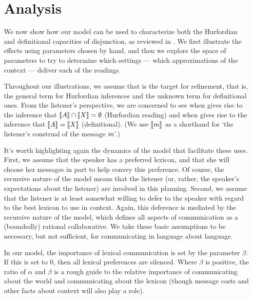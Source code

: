 \documentclass{article}
\begin{document}

\section{Analysis}\label{sec:analysis}

We now show how our model can be used to characterize both the
Hurfordian and definitional capacities of disjunction, as reviewed in
. We first illustrate the effects using parameters
chosen by hand, and then we explore the space of parameters to try to
determine which settings --- which approximations of the context ---
deliver each of the readings. 

Throughout our illustrations, we assume that  is the target
for refinement, that is, the general term for Hurfordian inferences
and the unknown term for definitional ones.  From the listener's
perspective, we are concerned to see when  gives rise to
the inference that $\llbracket A\rrbracket \cap \llbracket X\rrbracket = \emptyset$ (Hurfordian
reading) and when  gives rise to the inference that
$\llbracket A\rrbracket = \llbracket X\rrbracket$ (definitional). (We use $\llbracket m\rrbracket$ as a
shorthand for `the listener's construal of the message $m$'.)

It's worth highlighting again the dynamics of the model that
facilitate these uses. First, we assume that the speaker has a
preferred lexicon, and that she will choose her messages in part to
help convey this preference. Of course, the recursive nature of the
model means that the listener (or, rather, the speaker's expectations
about the listener) are involved in this planning. Second, we assume
that the listener is at least somewhat willing to defer to the speaker
with regard to the best lexicon to use in context. Again, this
deference is mediated by the recursive nature of the model, which
defines all aspects of communication as a (boundedly) rational
collaborative. We take these basic assumptions to be necessary, but
not sufficient, for communicating in language about language.

In our model, the importance of lexical communication is set by the
parameter $\beta$. If this is set to $0$, then all lexical preferences
are silenced. Where $\beta$ is positive, the ratio of $\alpha$ and
$\beta$ is a rough guide to the relative importance of communicating
about the world and communicating about the lexicon (though message
costs and other facts about context will also play a role).
\end{document}
